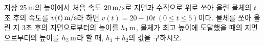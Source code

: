 지상 $25\mkern3mu \mathrm{m}$의 높이에서 처음 속도 $20\mkern3mu \mathrm{m/s}$로 지면과 수직으로 위로 쏘아 올린 물체의 $t$초 후의 속도를 $v(t)\mkern3mu \mathrm{m/s}$라 하면 $v(t)=20-10t\ (0\le t\le 5)$이다. 물체를 쏘아 올린 지 \mbox{$3$초} 후의 지면으로부터의 높이를 $h_1\mkern3mu \mathrm{m}$, 물체가 최고 높이에 도달했을 때의 지면으로부터의 높이를 $h_2\mkern3mu \mathrm{m}$라 할 때, $h_1+h_2$의 값을 구하시오.
